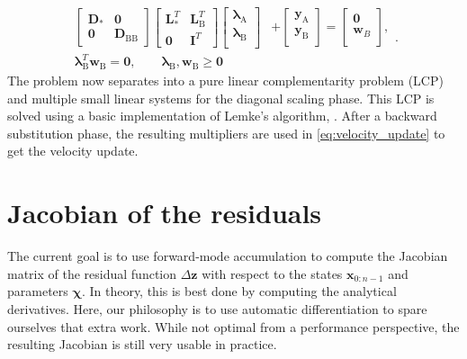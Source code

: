 \documentclass[preprint,12pt]{elsarticle}
\let\vec\bm
\let\mat\mathbf
\def\param{\vec{\chi}}
\numberwithin{equation}{section}
\def\tA{\text{A}}
\def\tB{\text{B}}
\def\lambdaa{\vec{\lambda}_{\text{A}}}
\def\lambdab{\vec{\lambda}_{\text{B}}}
\newcommand{\complementarity}[2]{#1^T #2 = \vec{0}, \qquad #1, #2 \geq \vec{0}}
\begin{document}
\begin{equation}
    \begin{aligned}
        \begin{bmatrix}
            \mat{D}_{*} & \mat{0}      \\
            \mat{0}      & \mat{D}_{\tB \tB}
        \end{bmatrix}
        \begin{bmatrix}
            \mat{L}_{*}^T & \mat{L}_{\tB}^T \\
            \mat{0}        & \mat{I}^T
        \end{bmatrix}
        \begin{bmatrix}
            \lambdaa \\
            \lambdab \\
        \end{bmatrix}
         & +
        \begin{bmatrix}
            \vec{y}_\tA \\
            \vec{y}_\tB \\
        \end{bmatrix}
        =
        \begin{bmatrix}
            \vec{0}   \\
            \vec{w}_B \\
        \end{bmatrix}, \\
        \complementarity{\lambdab}{\vec{w}_{\tB}}
    \end{aligned}.
\end{equation}
The problem now separates into a pure linear complementarity problem (LCP) and multiple small linear systems for the diagonal scaling phase.
This LCP is solved using a basic implementation of Lemke's algorithm, \cite{murty1988linear}.
After a backward substitution phase, the resulting multipliers are used in \eqref{eq:velocity_update} to get the velocity update.

\section{Jacobian of the residuals}
\label{appendix:jacobian}
The current goal is to use forward-mode accumulation to compute the Jacobian matrix of the residual function $\Delta \vec{z}$ with respect to the states $\vec{x}_{0:n-1}$ and parameters $\param$.
In theory, this is best done by computing the analytical derivatives.
Here, our philosophy is to use automatic differentiation to spare ourselves that extra work.
While not optimal from a performance perspective, the resulting Jacobian is still very usable in practice.
\end{document}
